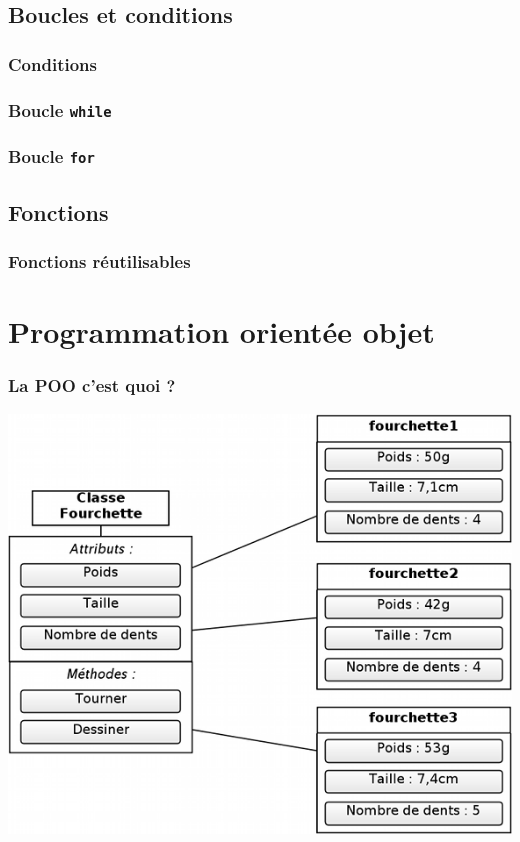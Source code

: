 \documentclass{beamer}
\begin{document}
    \subsection{Boucles et conditions}
    \begin{frame}
        \frametitle{Conditions}
        
    \end{frame}
    \begin{frame}
        \frametitle{Boucle \texttt{while}}
        
    \end{frame}
    \begin{frame}
        \frametitle{Boucle \texttt{for}}
        
    \end{frame}
    \subsection{Fonctions}
    \begin{frame}
        \frametitle{Fonctions réutilisables}
        
    \end{frame}
    \begin{frame}
        
    \end{frame}

    \section{Programmation orientée objet}
    \begin{frame}
        \frametitle{La POO c'est quoi ?}
        \centering
        \includegraphics[width=.7\textwidth]{assets/schéma_poo.png}
    \end{frame}
\end{document}
